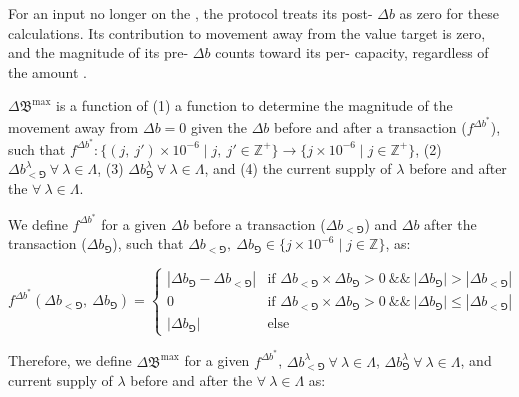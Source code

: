 \documentclass[class=article, crop=false]{standalone}
\begin{document}
\begin{enumerate}
    For an input  no longer on the , the protocol treats its post- $\Delta b$ as zero for these calculations. Its contribution to movement away from the value target is zero, and the magnitude of its pre- $\Delta b$ counts toward its per-  capacity, regardless of the amount .

    $\Delta \mathfrak{B}^\text{max}$ is a function of 
    (1) a function to determine the magnitude of the movement away from $\Delta b = 0$ given the $\Delta b$ before and after a transaction ($f^{\Delta b^{*}}$), such that $f^{\Delta b^{*}}\colon \{(j,\ j') \times 10^{-6} \mid j,\ j' \in \mathbb{Z}^{+} \} \rightarrow \{j \times 10^{-6} \mid j \in \mathbb{Z}^{+} \}$, 
    (2) $\Delta b_{<\Game}^{\lambda}\ \forall\ \lambda \in \Lambda$, 
    (3) $\Delta b_{\Game}^{\lambda}\ \forall\ \lambda \in \Lambda$, and 
    (4) the current supply of $\lambda$ before and after the  $\forall\ \lambda \in \Lambda$.

    We define $f^{\Delta b^{*}}$ for a given $\Delta b$ before a transaction ($\Delta b_{<\Game}$) and $\Delta b$ after the transaction ($\Delta b_{\Game}$), such that $\Delta b_{<\Game},\ \Delta b_{\Game} \in \{j \times 10^{-6} \mid j \in \mathbb{Z} \}$, as:

        $$
            f^{\Delta b^{*}}(\Delta b_{<\Game},\ \Delta b_{\Game}) =
                \begin{cases}
                    |\Delta b_{\Game} - \Delta b_{<\Game}| 
                        & \text{if } \Delta b_{<\Game} \times \Delta b_{\Game} > 0\ 
                    \text{\&\&}\ |\Delta b_{\Game}| > |\Delta b_{<\Game}| \\
                    
                    0 
                        & \text{if } \Delta b_{<\Game} \times \Delta b_{\Game} > 0\ 
                    \text{\&\&}\ |\Delta b_{\Game}| \leq |\Delta b_{<\Game}| \\
                    
                    |\Delta b_{\Game}| 
                        & \text{else }
            \end{cases}
        $$
    
    Therefore, we define $\Delta \mathfrak{B}^\text{max}$ for a given $f^{\Delta b^{*}}$, $\Delta b_{<\Game}^{\lambda}\ \forall\ \lambda \in \Lambda$, $\Delta b_{\Game}^{\lambda}\ \forall\ \lambda \in \Lambda$, and current supply of $\lambda$ before and after the  $\forall\ \lambda \in \Lambda$ as:


\end{enumerate}
\end{document}
